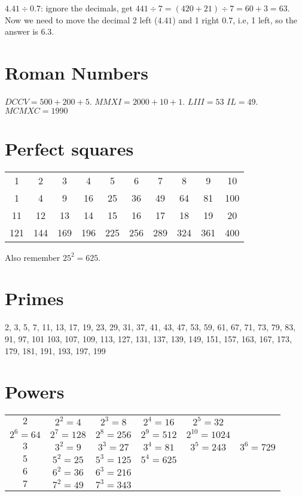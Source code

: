 \documentclass[fullpage,twocolumn]{article}
\begin{document}
$4.41 \div 0.7$: ignore the decimals, get $441\div 7 = (420 + 21) \div 7 = 60 + 3 = 63$.
Now we need to move the decimal 2 left ($4.41$) and 1 right $0.7$, i.e, 1 left,
so the answer is $6.3$.

\section{Roman Numbers}

$DCCV = 500 + 200 + 5$. $MMXI = 2000 + 10  + 1$. $LIII = 53$ $IL = 49$. $MCMXC = 1990$



\section{Perfect squares}
{\tiny
\begin{tabular}{|c|c|c|c|c|c|c|c|c|c|} \hline
1 & 2 & 3 & 4 & 5 & 6 & 7 & 8 & 9 & 10 \\
1 & 4 & 9 & 16 & 25 & 36 & 49 & 64 & 81 & 100 \\ \hline
11 & 12 & 13 & 14 & 15 & 16 & 17 & 18 & 19 & 20 \\
121 & 144 & 169 & 196 & 225 & 256 & 289 & 324 & 361 & 400 \\ \hline
\end{tabular}
}

Also remember $25^2 = 625$.

\section{Primes}
2, 3, 5, 7, 11, 13, 17, 19, 23, 29, 31, 37, 41, 43, 47, 53, 59, 61, 67, 71, 73, 79, 83, 91, 97, 101    103, 107, 109, 113, 127, 131, 137, 139, 149, 151, 157, 163, 167, 173, 179, 181, 191, 193, 197, 199

\section{Powers}
{\tiny
\begin{tabular}{|c|c|c|c|c|c|} \hline
$2$ & $2^2 = 4$ & $2^3 = 8$ & $2^4 = 16$ & $2^5 = 32$  & \\
$2^6 = 64$ & $2^7 = 128$ & $2^8 = 256$ & $2^9 = 512$ & $2^{10} = 1024$  & \\
$3$ & $3^2 = 9$ & $3^3 = 27$ & $3^4 = 81$ & $3^5  = 243$ & $3^6 = 729$  \\
$5$ & $5^2 = 25$ & $5^3 = 125$ & $5^4 = 625$  & & \\
$6$ & $6^2 = 36$ & $6^3 = 216$ &     &         &  \\
$7$ & $7^2 = 49$ & $7^3 = 343$ &     &         & \\ \hline
\end{tabular}
}
\end{document}
